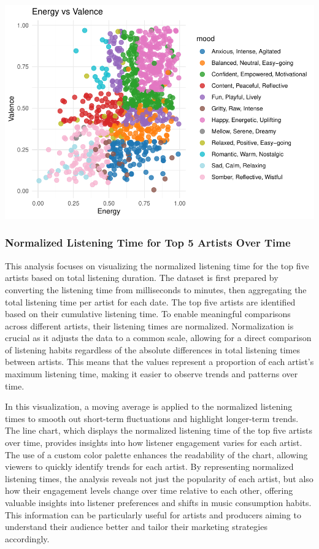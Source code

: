 \documentclass[
]{article}
\begin{document}
\includegraphics{SpotifyProjectPDF_files/figure-latex/unnamed-chunk-14-3.pdf}

\subsubsection{Normalized Listening Time for Top 5 Artists Over
Time}\label{normalized-listening-time-for-top-5-artists-over-time}

This analysis focuses on visualizing the normalized listening time for
the top five artists based on total listening duration. The dataset is
first prepared by converting the listening time from milliseconds to
minutes, then aggregating the total listening time per artist for each
date. The top five artists are identified based on their cumulative
listening time. To enable meaningful comparisons across different
artists, their listening times are normalized. Normalization is crucial
as it adjusts the data to a common scale, allowing for a direct
comparison of listening habits regardless of the absolute differences in
total listening times between artists. This means that the values
represent a proportion of each artist's maximum listening time, making
it easier to observe trends and patterns over time.

In this visualization, a moving average is applied to the normalized
listening times to smooth out short-term fluctuations and highlight
longer-term trends. The line chart, which displays the normalized
listening time of the top five artists over time, provides insights into
how listener engagement varies for each artist. The use of a custom
color palette enhances the readability of the chart, allowing viewers to
quickly identify trends for each artist. By representing normalized
listening times, the analysis reveals not just the popularity of each
artist, but also how their engagement levels change over time relative
to each other, offering valuable insights into listener preferences and
shifts in music consumption habits. This information can be particularly
useful for artists and producers aiming to understand their audience
better and tailor their marketing strategies accordingly.
\end{document}
